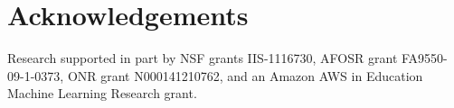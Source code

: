 \documentclass[12pt,pdftex,aos]{imsart}
\numberwithin{equation}{section}
\theoremstyle{plain}
\theoremstyle{remark}
\begin{document}
\maketitle
\vskip10pt













\clearpage


\newpage

%


\section*{Acknowledgements}
Research supported in part by NSF grants IIS-1116730, 
AFOSR grant FA9550-09-1-0373, ONR grant
N000141210762, and an Amazon AWS in Education Machine Learning
Research grant.




\end{document}
